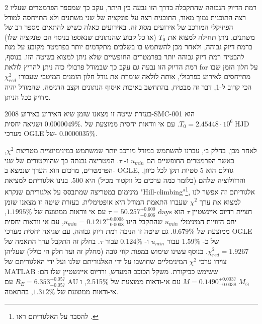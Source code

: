 \documentclass{article}
\begin{document}
\begin{multicols}{2}
רמת הדיוק הגבוהה שהתקבלה בדרך הזו נבעה בין היתר, עקב כך שמספר הפרמטרים שעליו רצה התוכנית נמוך מאוד, התוכנית רצה על פונקציה של שני משתנים ולא התייחסה למודל הפיזיקלי המורכב של אירועים מסוג זה, באירועים כאלה כשיש להתאים מספר רב של משתנים, ניתן תחילה למצוא את 
$T_0$
(או כל קבוע שהנתונים שנאספו בניסוי הם פונקציה שלו)
ברמת דיוק גבוהה,
ולאחר מכן להשתמש בו בשלבים מתקדמים יותר בפרמטר מקובע על מנת להבטיח רמת דיוק גבוהה יותר בפרמטרים החופשיים שלא ניתן למצוא בשיטה הזו.
בנוסף, רמת הדיוק הזו נבעה גם עקב כך שבמודל פרבולי כזה ניתן להריץ לולאת 
\textenglish{for}
על חלון הזמן שבו מתייחסים לאירוע כפרבולי,
אותה לולאה שומרת את גודל חלון הזמנים המיטבי שעבורו 
$\chi^2_{red}$
הכי קרוב ל-1,
דבר זה מבטיח, בהתחשב באיכות איסוף הנתונים וקצב הדגימה, שהמודל יהיה מדויק ככל הניתן.

בעזרת שיטה זו מצאנו שזמן שיא האירוע באירוע
\mbox{\textenglish{2008-SMC-001}}
הוא
$T_0 = 2.45448\cdot10^6 \;\text{HJD}$.
עם אי וודאות יחסית ממוצעת של 
$0.0000049\%.$
ושגיאה יחסית מערכי
\textenglish{OGLE}
של-
$0.0000035\%$.
\vspace{0.25cm}

\noindent
לאחר מכן, בחלק ב׳, עברנו להשתמש במודל מורכב יותר שמשתמש במינימיזציית מטריצת
$\chi^2$,
כאשר הפרמטרים החופשיים הם 
$u_{min}$
ו-
$\tau$.
המטריצה נבנתה כך שהווקטורים של שני הפרמטרים, מרכזם הוא הערך שנמצא ב-
\textenglish{OGLE},
גודלם הוא 5 סטיות תקן לכל כיוון, והרזולוציה שלהם (כלומר כמה ערכים כל ווקטור מכיל)
היא 500.
בנינו אלגוריתם למציאת מינימום במטריצה שמתבסס על אלגוריתם שנקרא 
"\textenglish{Hill-climbing}"\footnote{
להסבר על האלגוריתם ראו
.
},
אלגוריתם זה אפשר לנו למצוא את ערך 
$\chi^2$
שעברו התאמת המודל היא אופטימלית.
בעזרת שיטה זו מצאנו שזמן חציית רדיוס איינשטיין 
$\tau$
הוא 
\mbox{$\tau = 50.257^{+0.600}_{-0.606} \text{ days}$}
עם אי וודאות ממוצעת של 
$1.1995\%$,
יחס הזוויות המינימלי
$u_{min}$
שהתקבל הינו
\mbox{$u_{min} = 0.1212 ^{+0.0008}  _{-0.0008}$},
עם אי וודאות יחסית ממוצעת של
$0.679\%$.
גם שיטה זו הניבה רמת דיוק גבוהה, עם שגיאה יחסית מערכי 
\textenglish{OGLE}
של כ-
1.59\%
עבור 
$u_{min}$
ו-
0.124\%
עבור 
$\tau$.
בחלק זה התקבל ערך התאמה של
$\chi^2_{red}=1.9267$.
בנוסף עשינו שימוש במפות קווי גובה (מחלק זה ועד חלק ה׳ כולל) שעליהן צוירו ערכי 
$\chi^2$
המינימליים שחושבו על ידי האלגוריתם שלנו ועל ידי האלגוריתם של 
\textenglish{MATLAB}
ששימש כביקורת.
משקל הכוכב המעדש, ורדיוס איינשטיין שלו הם:
\mbox{$M=0.1490^{+0.0037}_{-0.0038}\; M_{\odot}$}
עם אי-ודאות ממוצעת של
\mbox{2.515\%},
ו
\mbox{$R_E = 6.353^{+0.057}_{-0.057}\;\text{AU}$}
עם אי-ודאות ממוצעת של 
$1.312\%$,
בהתאמה.


\end{multicols}
\end{document}
